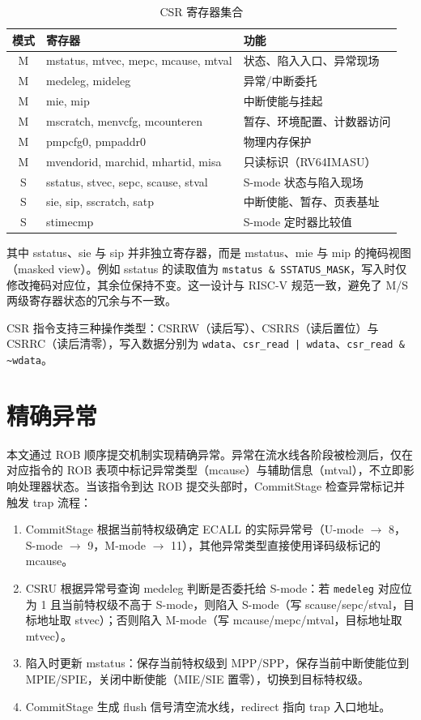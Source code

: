\begin{table}[H]
  \centering
  \caption{CSR 寄存器集合}
  \label{tbl:csr-set}
  \begin{tabular}{cll}
    \toprule
    模式 & 寄存器 & 功能 \\
    \midrule
    M & mstatus, mtvec, mepc, mcause, mtval & 状态、陷入入口、异常现场 \\
    M & medeleg, mideleg & 异常/中断委托 \\
    M & mie, mip & 中断使能与挂起 \\
    M & mscratch, menvcfg, mcounteren & 暂存、环境配置、计数器访问 \\
    M & pmpcfg0, pmpaddr0 & 物理内存保护 \\
    M & mvendorid, marchid, mhartid, misa & 只读标识（RV64IMASU） \\
    S & sstatus, stvec, sepc, scause, stval & S-mode 状态与陷入现场 \\
    S & sie, sip, sscratch, satp & 中断使能、暂存、页表基址 \\
    S & stimecmp & S-mode 定时器比较值 \\
    \bottomrule
  \end{tabular}
\end{table}

其中 sstatus、sie 与 sip 并非独立寄存器，而是 mstatus、mie 与 mip 的掩码视图（masked view）。例如 sstatus 的读取值为 \lstinline|mstatus & SSTATUS_MASK|，写入时仅修改掩码对应位，其余位保持不变。这一设计与 RISC-V 规范一致，避免了 M/S 两级寄存器状态的冗余与不一致。

CSR 指令支持三种操作类型：CSRRW（读后写）、CSRRS（读后置位）与 CSRRC（读后清零），写入数据分别为 \lstinline|wdata|、\lstinline!csr_read | wdata!、\lstinline|csr_read & ~wdata|。

\section{精确异常}

本文通过 ROB 顺序提交机制实现精确异常。异常在流水线各阶段被检测后，仅在对应指令的 ROB 表项中标记异常类型（mcause）与辅助信息（mtval），不立即影响处理器状态。当该指令到达 ROB 提交头部时，CommitStage 检查异常标记并触发 trap 流程：

\begin{enumerate}
  \item CommitStage 根据当前特权级确定 ECALL 的实际异常号（U-mode $\to$ 8，S-mode $\to$ 9，M-mode $\to$ 11），其他异常类型直接使用译码级标记的 mcause。
  \item CSRU 根据异常号查询 medeleg 判断是否委托给 S-mode：若 \lstinline|medeleg| 对应位为 1 且当前特权级不高于 S-mode，则陷入 S-mode（写 scause/sepc/stval，目标地址取 stvec）；否则陷入 M-mode（写 mcause/mepc/mtval，目标地址取 mtvec）。
  \item 陷入时更新 mstatus：保存当前特权级到 MPP/SPP，保存当前中断使能位到 MPIE/SPIE，关闭中断使能（MIE/SIE 置零），切换到目标特权级。
  \item CommitStage 生成 flush 信号清空流水线，redirect 指向 trap 入口地址。
\end{enumerate}


